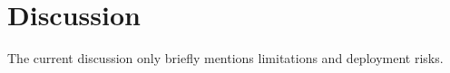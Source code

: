 \section{Discussion}
The current discussion only briefly mentions limitations and deployment risks.
